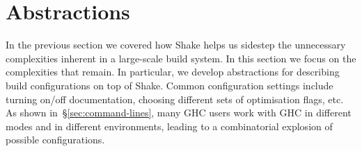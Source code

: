 \section{Abstractions\label{sec:abstractions}}


In the previous section we covered how Shake helps us sidestep the unnecessary
complexities inherent in a large-scale build system. In this section we focus on
the complexities that remain. In particular, we develop abstractions for
describing build configurations on top of Shake. Common configuration settings
include turning on/off documentation, choosing different sets of optimisation
flags, etc. As shown in~\S\ref{sec:command-lines}, many GHC users work with GHC
in different modes and in different environments, leading to a combinatorial
explosion of possible configurations.




